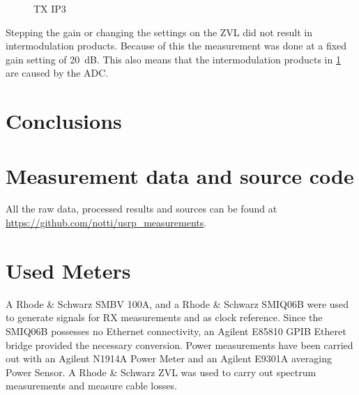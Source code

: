 \documentclass[12pt,a4paper,parskip=full,abstracton]{scrartcl}
\begin{document}
\begin{figure}[htb]
    \centering
{}
    \caption{TX IP3}
    \label{fig:txip3}
\end{figure}
Stepping the gain or changing the settings on the ZVL did not result
in intermodulation products. Because of this the measurement was done
at a fixed gain setting of \SI{20}{\deci\bel}. This also means that
the intermodulation products in \cref{fig:txip3} are caused by the ADC.
\clearpage
\section{Conclusions}
\clearpage
\begin{appendix}
\section{Measurement data and source code}
\label{sec:sources}
All the raw data, processed results and sources can be found at
\url{https://github.com/notti/usrp_measurements}.
\section{Used Meters}
\label{sec:meters}
A Rhode \& Schwarz SMBV 100A, and a Rhode \& Schwarz SMIQ06B were used to generate
signals for RX measurements and as clock reference. Since the SMIQ06B possesses no
Ethernet connectivity, an Agilent E85810 GPIB Etheret bridge provided the necessary
conversion. Power measurements have been carried out with an Agilent N1914A Power Meter and an
Agilent E9301A averaging Power Sensor. A Rhode \& Schwarz ZVL was used to carry out
spectrum measurements and measure cable losses.

\printglossary[type=\acronymtype]

\listoffigures



\end{appendix}
\end{document}
